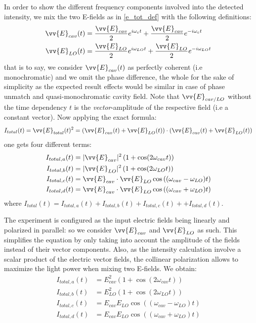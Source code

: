 \documentclass[11pt]{report}
\begin{document}
In order to show the different frequency components involved into the detected intensity, we mix the two E-fields as in \eqref{e_tot_def} with the following definitions:
\begin{align}
\label{e_cav_e_lo}
\begin{split}
\vv{E}_{cav}(t) &=\frac{\vv{E}_{cav}}{2} e^{i\omega_{c}t} + \frac{\vv{E}_{cav}}{2} e^{-i\omega_{c}t} \\
\vv{E}_{LO}(t) &= \frac{\vv{E}_{LO}}{2} e^{i\omega_{LO}t} + \frac{\vv{E}_{LO}}{2} e^{-i\omega_{LO}t}
\end{split}
\end{align}that is to say, we consider $\vv{E}_{cav}(t)$ as perfectly coherent (i.e monochromatic) and we omit the phase difference, the whole for the sake of simplicity as the expected result effects would be similar in case of phase unmatch and quasi-monochromatic cavity field. Note that $\vv{E}_{cav/LO}$ without the time dependency $t$ is the \textit{vector}-amplitude of the respective field (i.e a constant vector). Now applying the exact formula:
\begin{equation}
I_{total}(t) = \vv{E}_{total}(t)^2 = \left(\vv{E}_{cav}(t) + \vv{E}_{LO}(t)\right) \cdot \left(\vv{E}_{cav}(t) + \vv{E}_{LO}(t)\right)
\end{equation} 
one gets four different terms:
\begin{align}
I_{total,a}(t) &= \vert\vv{E}_{cav}\vert^2\left(1 + \cos(2\omega_{cav}t)\right)\\
I_{total,b}(t) &= \vert\vv{E}_{LO}\vert^2\left(1 + \cos(2\omega_{LO}t)\right)\\
I_{total,c}(t) &= \vv{E}_{cav}\cdot\vv{E}_{LO}\cos\left((\omega_{cav} - \omega_{LO})t\right)\\
I_{total,d}(t) &= \vv{E}_{cav}\cdot\vv{E}_{LO}\cos\left((\omega_{cav} + \omega_{LO})t\right)
\end{align}
where $I_{total}(t) = I_{total,a}(t) + I_{total,b}(t) + I_{total,c}(t) + + I_{total,d}(t)$.

The experiment is configured as the input electric fields being linearly and polarized in parallel: so we consider $\vv{E}_{cav}$ and $\vv{E}_{LO}$ as such. This simplifies the equation by only taking into account the amplitude of the fields instead of their vector components. Also, as the intensity calculation involve a scalar product of the electric vector fields, the collinear polarization allows to maximize the light power when mixing two E-fields. We obtain:
\begin{align}
I_{total,a}(t) &= E_{cav}^2\left(1 + \cos(2\omega_{cav}t)\right)\\
I_{total,b}(t) &= E_{LO}^2\left(1 + \cos(2\omega_{LO}t)\right)\\
\label{mix_hetero_ic}
I_{total,c}(t) &= E_{cav}E_{LO}\cos\left((\omega_{cav} - \omega_{LO})t\right)\\
\label{mix_hetero_id}
I_{total,d}(t) &= E_{cav}E_{LO}\cos\left((\omega_{cav} + \omega_{LO})t\right)
\end{align}
\end{document}
